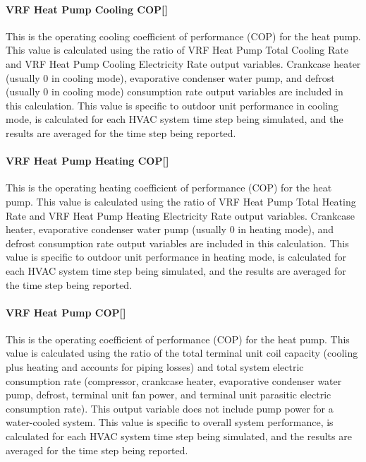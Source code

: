 \paragraph{\texorpdfstring{VRF Heat Pump Cooling COP{[]}}{VRF Heat Pump Cooling COP}}\label{vrf-heat-pump-cooling-cop}

This is the operating cooling coefficient of performance (COP) for the heat pump. This value is calculated using the ratio of VRF Heat Pump Total Cooling Rate and VRF Heat Pump Cooling Electricity Rate output variables. Crankcase heater (usually 0 in cooling mode), evaporative condenser water pump, and defrost (usually 0 in cooling mode) consumption rate output variables are included in this calculation. This value is specific to outdoor unit performance in cooling mode, is calculated for each HVAC system time step being simulated, and the results are averaged for the time step being reported.

\paragraph{\texorpdfstring{VRF Heat Pump Heating COP{[]}}{VRF Heat Pump Heating COP}}\label{vrf-heat-pump-heating-cop}

This is the operating heating coefficient of performance (COP) for the heat pump. This value is calculated using the ratio of VRF Heat Pump Total Heating Rate and VRF Heat Pump Heating Electricity Rate output variables. Crankcase heater, evaporative condenser water pump (usually 0 in heating mode), and defrost consumption rate output variables are included in this calculation. This value is specific to outdoor unit performance in heating mode, is calculated for each HVAC system time step being simulated, and the results are averaged for the time step being reported.

\paragraph{\texorpdfstring{VRF Heat Pump COP{[]}}{VRF Heat Pump COP}}\label{vrf-heat-pump-cop}

This is the operating coefficient of performance (COP) for the heat pump. This value is calculated using the ratio of the total terminal unit coil capacity (cooling plus heating and accounts for piping losses) and total system electric consumption rate (compressor, crankcase heater, evaporative condenser water pump, defrost, terminal unit fan power, and terminal unit parasitic electric consumption rate). This output variable does not include pump power for a water-cooled system. This value is specific to overall system performance, is calculated for each HVAC system time step being simulated, and the results are averaged for the time step being reported.

